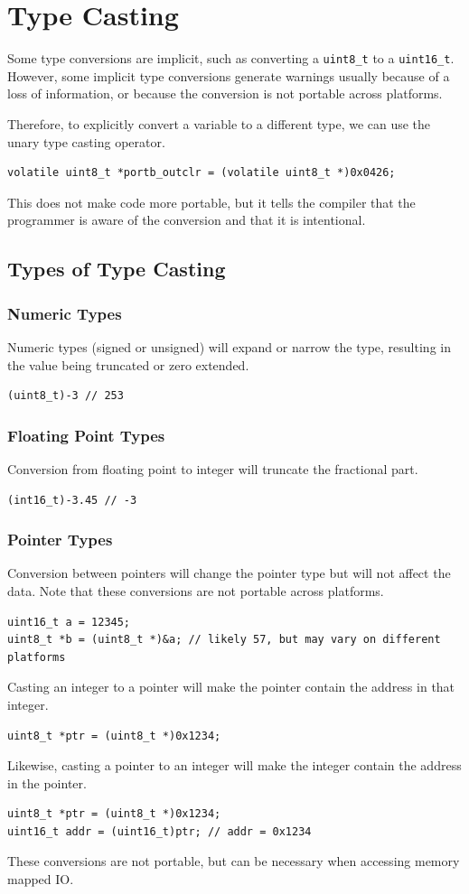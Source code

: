 \documentclass{report}
\begin{document}
\section{Type Casting}
Some type conversions are implicit, such as converting a \texttt{uint8_t}
to a \texttt{uint16_t}. However, some implicit type conversions generate warnings
usually because of a loss of information, or because the conversion is not portable across
platforms.

Therefore, to explicitly convert a variable to a different type, we can use the unary type casting operator.
\begin{verbatim}
volatile uint8_t *portb_outclr = (volatile uint8_t *)0x0426;
\end{verbatim}
This does not make code more portable, but it tells the compiler that
the programmer is aware of the conversion and that it is intentional.
\subsection{Types of Type Casting}
\subsubsection{Numeric Types}
Numeric types (signed or unsigned) will expand or narrow the type,
resulting in the value being truncated or zero extended.
\begin{verbatim}
(uint8_t)-3 // 253
\end{verbatim}
\subsubsection{Floating Point Types}
Conversion from floating point to integer will truncate the fractional part.
\begin{verbatim}
(int16_t)-3.45 // -3
\end{verbatim}
\subsubsection{Pointer Types}
Conversion between pointers will change the pointer type but will not affect the
data. Note that these conversions are not portable across platforms.
\begin{verbatim}
uint16_t a = 12345;
uint8_t *b = (uint8_t *)&a; // likely 57, but may vary on different platforms
\end{verbatim}
Casting an integer to a pointer will make the pointer contain the address in that integer.
\begin{verbatim}
uint8_t *ptr = (uint8_t *)0x1234;
\end{verbatim}
Likewise, casting a pointer to an integer will make the integer contain the address in the pointer.
\begin{verbatim}
uint8_t *ptr = (uint8_t *)0x1234;
uint16_t addr = (uint16_t)ptr; // addr = 0x1234
\end{verbatim}
These conversions are not portable, but can be necessary when accessing memory mapped IO\@.
\end{document}
